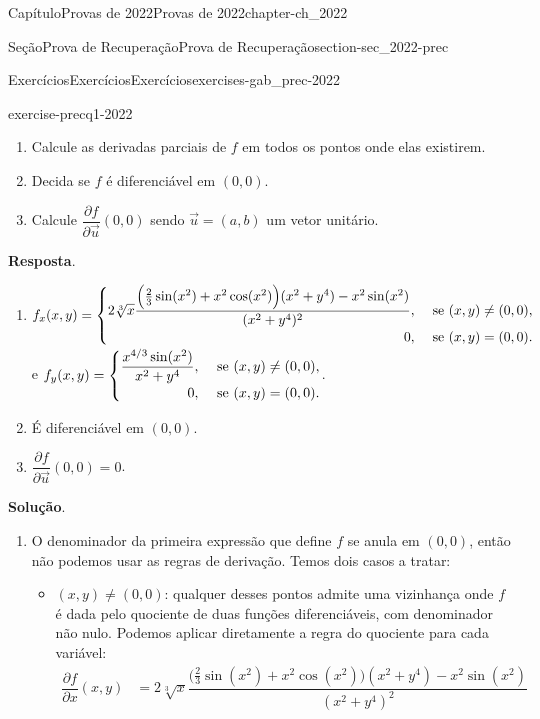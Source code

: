 \documentclass[oneside,10pt,]{book}
\newcommand{\blocktitlefont}{\relax}
\numberwithin{equation}{section}
\begin{document}
\begin{chapterptx}{Capítulo}{Provas de 2022}{}{Provas de 2022}{}{}{chapter-ch_2022}
\begin{sectionptx}{Seção}{Prova de Recuperação}{}{Prova de Recuperação}{}{}{section-sec_2022-prec}
\begin{exercises-subsection-numberless}{Exercícios}{Exercícios}{}{Exercícios}{}{}{exercises-gab_prec-2022}
\begin{divisionexercise}{1}{}{}{exercise-precq1-2022}
\begin{equation*}
\end{equation*}
%
\begin{enumerate}[label=\alph*.]
\item{}Calcule as derivadas parciais de \(f\) em todos os pontos onde elas existirem.%
\item{}Decida se \(f\) é diferenciável em \((0,0)\).%
\item{}Calcule \(\dfrac{\partial f}{\partial \vec{u}}(0,0)\) sendo \(\vec{u} =(a,b)\) um vetor unitário.%
\end{enumerate}
%
\par\smallskip%
\noindent\textbf{\blocktitlefont Resposta}.\hypertarget{answer-precq1-2022-b}{}\quad{}%
\begin{enumerate}[label=\alph*.]
\item{}\(f_x(x,y)=
\begin{cases}
2\sqrt[3]{x}\dfrac{\Big(\frac{2}{3}\sin(x^2)+x^2\cos(x^2)\Big)
(x^2+y^4)-x^2\sin(x^2)}{(x^2+y^4)^2},&\text{ se } (x,y) \neq (0,0),\\
\hfill 0,&\text{ se } (x,y)=(0,0).
\end{cases}\) e \(f_y(x,y)=
\begin{cases}
\dfrac{x^{4/3}\sin(x^2)}{x^2+y^4},&\text{ se } (x,y) \neq (0,0),\\
\hfill 0,&\text{ se } (x,y)=(0,0).
\end{cases}\).%
\item{}É diferenciável em \((0,0)\).%
\item{}\(\dfrac{\partial f}{\partial \vec{u}}(0,0)=0\).%
\end{enumerate}
%
\par\smallskip%
\noindent\textbf{\blocktitlefont Solução}.\hypertarget{solution-precq1-2022-c}{}\quad{}%
\begin{enumerate}[label=\alph*.]
\item{}O denominador da primeira expressão que define \(f\) se anula em \((0,0)\), então não podemos usar as regras de derivação. Temos dois casos a tratar:%
\begin{itemize}[label=\textbullet]
\item{}\((x,y)\neq (0,0)\): qualquer desses pontos admite uma vizinhança onde \(f\) é dada pelo quociente de duas funções diferenciáveis, com denominador não nulo. Podemos aplicar diretamente a regra do quociente para cada variável:%
\begin{align*}
\dfrac{\partial f}{\partial x}(x,y)&
=2\sqrt[3]{x}\dfrac{\Big(\frac{2}{3}\sin(x^2)+x^2\cos(x^2)\Big)
(x^2+y^4)-x^2\sin(x^2)}{(x^2+y^4)^2}\\

\end{align*}
\end{itemize}
\end{enumerate}
\end{divisionexercise}
\end{exercises-subsection-numberless}
\end{sectionptx}
\end{chapterptx}
\end{document}
